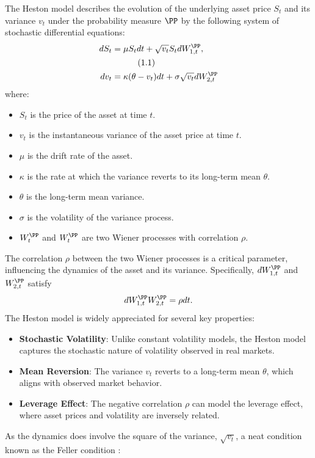 \documentclass[11pt]{article}
\numberwithin{equation}{section}
\begin{document}
The Heston model describes the evolution of the underlying asset price $S_t$ and
its variance $v_t$ under the probability measure $\PP$ by the following system of stochastic differential
equations:
\begin{align*}
    dS_t &= \mu S_t dt + \sqrt{v_t} S_t  dW_{1,t}^\PP, \\
    & \quad \tag{1.1} \\
    dv_t &= \kappa (\theta - v_t)  dt + \sigma \sqrt{v_t}  dW_{2,t}^\PP
\end{align*}
where:
\begin{itemize}
    \item $S_t$ is the price of the asset at time $t$.
    \item $v_t$ is the instantaneous variance of the asset price at time $t$.
    \item $\mu$ is the drift rate of the asset.
    \item $\kappa$ is the rate at which the variance reverts to its long-term mean $\theta$.
    \item $\theta$ is the long-term mean variance.
    \item $\sigma$ is the volatility of the variance process.
    \item $W_t^\PP$ and $W_t^\PP$ are two Wiener processes with correlation $\rho$.
\end{itemize}
The correlation $\rho$ between the two Wiener processes is a critical parameter, influencing the dynamics of the asset and its variance. Specifically, $dW_{1,t}^\PP$ and $W_{2,t}^\PP$ satisfy
\begin{align*}
    dW_{1,t}^\PP W_{2,t}^\PP = \rho  dt.
\end{align*}
The Heston model is widely appreciated for several key properties:
\begin{itemize}
    \item \textbf{Stochastic Volatility}: Unlike constant volatility models, the Heston model captures the stochastic nature of volatility observed in real markets.
    \item \textbf{Mean Reversion}: The variance $v_t$ reverts to a long-term mean $\theta$, which aligns with observed market behavior.
    \item \textbf{Leverage Effect}: The negative correlation $\rho$ can model the leverage effect, where asset prices and volatility are inversely related.
\end{itemize}
As the dynamics does involve the square of the variance, $\sqrt{v_t}$, a neat
condition known as the Feller condition \cite{feller1951two}:
\end{document}
